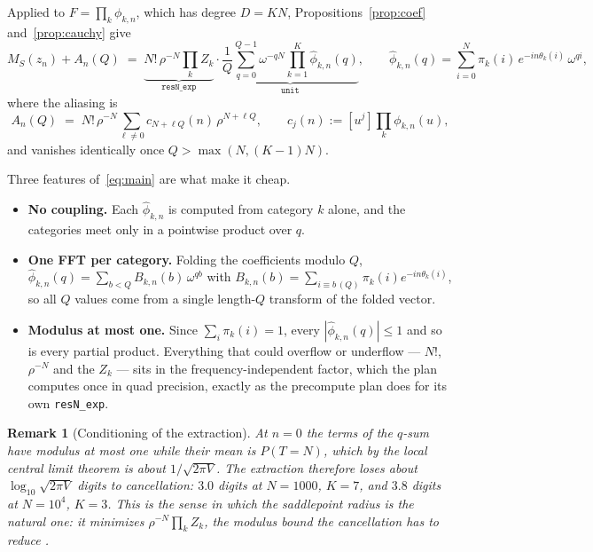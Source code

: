 \documentclass[11pt]{article}
\newtheorem{remark}{Remark}
\newcommand{\coef}[1]{[u^{#1}]}
\begin{document}
Applied to $F=\prod_k\phi_{k,n}$, which has degree $D=KN$, Propositions~\ref{prop:coef}
and~\ref{prop:cauchy} give
\begin{equation}
  \label{eq:main}
  M_S(z_n)+A_n(Q)\;=\;
  \underbrace{N!\,\rho^{-N}\prod_kZ_k}_{\texttt{resN\_exp}}\cdot
  \underbrace{\frac1Q\sum_{q=0}^{Q-1}\omega^{-qN}\prod_{k=1}^{K}\hat\phi_{k,n}(q)}_{\texttt{unit}},
  \qquad
  \hat\phi_{k,n}(q)=\sum_{i=0}^{N}\pi_k(i)\,e^{-in\theta_k(i)}\,\omega^{qi},
\end{equation}
where the aliasing is
\[
  A_n(Q)\;=\;N!\,\rho^{-N}\sum_{\ell\ne0}c_{N+\ell Q}(n)\,\rho^{N+\ell Q},
  \qquad c_j(n):=\coef{j}\prod_k\phi_{k,n}(u),
\]
and vanishes identically once $Q>\max(N,(K-1)N)$.

Three features of~\eqref{eq:main} are what make it cheap.
\begin{itemize}
  \item \textbf{No coupling.} Each $\hat\phi_{k,n}$ is computed from category $k$ alone, and the
        categories meet only in a pointwise product over $q$.
  \item \textbf{One FFT per category.} Folding the coefficients modulo $Q$,
        $\hat\phi_{k,n}(q)=\sum_{b<Q}B_{k,n}(b)\,\omega^{qb}$ with
        $B_{k,n}(b)=\sum_{i\equiv b\,(Q)}\pi_k(i)e^{-in\theta_k(i)}$, so all $Q$ values come from a single
        length-$Q$ transform of the folded vector.
  \item \textbf{Modulus at most one.} Since $\sum_i\pi_k(i)=1$, every $|\hat\phi_{k,n}(q)|\le1$ and so
        is every partial product. Everything that could overflow or underflow --- $N!$, $\rho^{-N}$
        and the $Z_k$ --- sits in the frequency-independent factor, which the plan computes once in
        quad precision, exactly as the precompute plan does for its own \texttt{resN\_exp}.
\end{itemize}

\begin{remark}[Conditioning of the extraction]
At $n=0$ the terms of the $q$-sum have modulus at most one while their mean is $P(T=N)$, which by
the local central limit theorem is about $1/\sqrt{2\pi V}$. The extraction therefore loses about
$\log_{10}\sqrt{2\pi V}$ digits to cancellation: $3.0$ digits at $N=1000$, $K=7$, and $3.8$ digits
at $N=10^4$, $K=3$. This is the sense in which the saddlepoint radius is the natural one: it
minimizes $\rho^{-N}\prod_kZ_k$, the modulus bound the cancellation has to reduce
\citep{bornemann2011}.
\end{remark}
\end{document}
